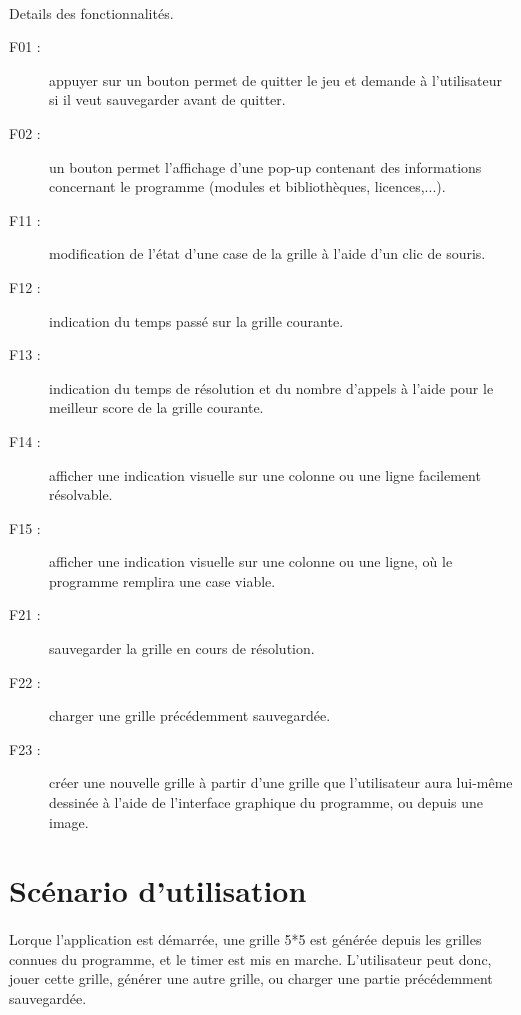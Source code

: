 \paragraph*{}
Details des fonctionnalités.
\begin{description}
\item[F01 :] appuyer sur un bouton permet de quitter le jeu et demande à l'utilisateur si il veut sauvegarder avant de quitter.

\item[F02 :] un bouton permet l'affichage d'une pop-up contenant des informations concernant le programme (modules et bibliothèques, licences,...).

\item[F11 :] modification de l'état d'une case de la grille à l'aide d'un clic de souris.

\item[F12 :] indication du temps passé sur la grille courante.

\item[F13 :] indication du temps de résolution et du nombre d'appels à l'aide pour le meilleur score de la grille courante.

\item[F14 :] afficher une indication visuelle sur une colonne ou une ligne facilement résolvable. 

\item[F15 :] afficher une indication visuelle sur une colonne ou une ligne, où le programme remplira une case viable.

\item[F21 :] sauvegarder la grille en cours de résolution.

\item[F22 :] charger une grille précédemment sauvegardée.

\item[F23 :] créer une nouvelle grille  à partir d'une grille que l'utilisateur aura lui-même dessinée à l'aide  de l'interface graphique du programme, ou depuis une image.

\end{description}


\section{Scénario d'utilisation}
\paragraph*{}
Lorque l'application est démarrée, une grille 5*5 est générée depuis les grilles connues du programme, et le timer est mis en marche. L'utilisateur peut donc, jouer cette grille, générer une autre grille, ou charger une partie précédemment sauvegardée.
